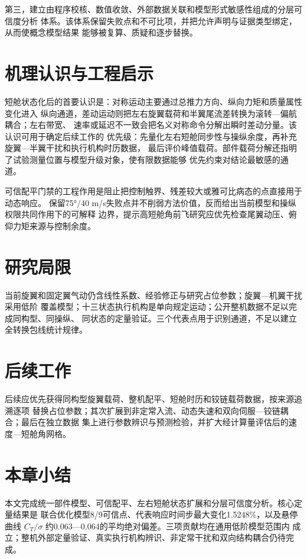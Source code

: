\documentclass[UTF8,12pt,oneside,openany,fontset=windows]{ctexbook}
\begin{document}
第三，建立由程序校核、数值收敛、外部数据关联和模型形式敏感性组成的分层可信度分析 体系。该体系保留失败点和不可比项，并把允许声明与证据类型绑定，从而使概念模型结果 能够被复算、质疑和逐步替换。

\section{机理认识与工程启示}

短舱状态化后的首要认识是：对称运动主要通过总推力方向、纵向力矩和质量属性变化进入 纵向通道，差动运动则把左右旋翼载荷和半翼尾流差转换为滚转—偏航耦合；左右带宽、 速率或延迟不一致会把名义对称命令分解出瞬时差动分量。该认识可用于确定后续工作的 优先级：先量化左右短舱同步性与操纵余度，再补充旋翼—半翼干扰和执行机构时历数据， 最后评价峰值载荷。部件载荷分解还指明了试验测量位置与模型升级对象，使有限数据能够 优先约束对结论最敏感的通道。

可信配平门禁的工程作用是阻止把控制触界、残差较大或雅可比病态的点直接用于动态响应。 保留75°/40 m/s失败点并不削弱方法价值，反而给出当前模型和操纵权限共同作用下的可解释 边界，提示高短舱角前飞研究应优先检查尾翼动压、俯仰力矩来源与控制余度。

\section{研究局限}

当前旋翼和固定翼气动仍含线性系数、经验修正与研究占位参数；旋翼—机翼干扰采用低阶 覆盖模型；十三状态执行机构是单向规定运动；公开整机数据不足以完成同构型、同操纵、 同状态的定量验证。三个代表点用于识别通道，不足以建立全转换包线统计规律。

\section{后续工作}

后续应优先获得同构型旋翼载荷、整机配平、短舱时历和铰链载荷数据，按来源追溯逐项 替换占位参数；其次扩展到非定常入流、动态失速和双向伺服—铰链耦合；最后在独立数据 集上进行参数辨识与预测检验，并扩大经计算量评估后的速度—短舱角网格。

\section{本章小结}

本文完成统一部件模型、可信配平、左右短舱状态扩展和分层可信度分析。核心定量结果是 联合优化模型8/9可信点、代表响应时间步最大变化1.5248\%，以及悬停曲线 \(C_T/\sigma\) 约0.063—0.064的平均绝对偏差。三项贡献均在通用低阶模型范围内 成立；整机外部定量验证、真实执行机构辨识、非定常干扰和双向结构耦合仍待完成。
\end{document}
